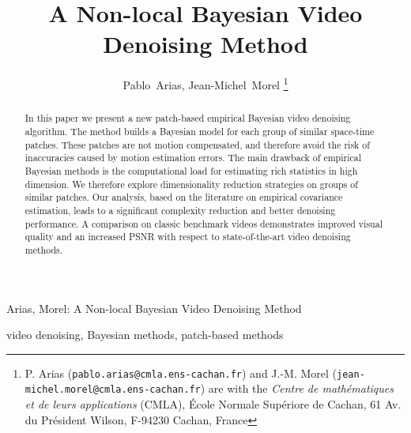 \documentclass[10pt, journal, twocolumn, final, a4paper]{IEEEtran}
\begin{document}
\title{A Non-local Bayesian Video Denoising Method}

\author{Pablo~Arias, Jean-Michel~Morel%
\thanks{P. Arias (\texttt{pablo.arias@cmla.ens-cachan.fr}) and J.-M. Morel
(\texttt{jean-michel.morel@cmla.ens-cachan.fr}) are with the \emph{Centre de
math\'ematiques et de leurs applications} (CMLA), \'Ecole Normale Sup\'eriore
de Cachan, 61 Av. du Pr\'esident Wilson, F-94230 Cachan, France}}

%
{Arias, Morel: A Non-local Bayesian Video Denoising Method}


\maketitle              %

\begin{abstract}
In this paper we present a new patch-based empirical Bayesian video denoising algorithm.
The method builds a Bayesian model for each group of similar space-time
patches. These patches are not motion compensated, and therefore avoid the
risk of inaccuracies caused by motion estimation errors. The main drawback of empirical Bayesian
methods is the computational load for estimating rich statistics in high
dimension. We therefore explore dimensionality reduction strategies on groups
of similar patches. Our analysis, based on the literature
on empirical covariance estimation, leads to a significant complexity
reduction and better denoising performance. A comparison on classic benchmark
videos demonstrates improved visual quality and an increased PSNR with respect
to state-of-the-art video denoising methods.
\end{abstract}

\begin{IEEEkeywords}
	video denoising, Bayesian methods, patch-based methods
\end{IEEEkeywords}


%
\IEEEpeerreviewmaketitle
\end{document}
